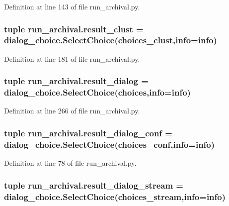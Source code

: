 Definition at line 143 of file run\-\_\-archival.\-py.

\hypertarget{namespacerun__archival_a722e4f43ec0f9bfe74c6535f3ebe2f62}{
\subsubsection[{result\-\_\-clust}]{\setlength{\rightskip}{0pt plus 5cm}tuple run\-\_\-archival.\-result\-\_\-clust = dialog\-\_\-choice.\-Select\-Choice({\bf choices\-\_\-clust},{\bf info}={\bf info})}}\label{namespacerun__archival_a722e4f43ec0f9bfe74c6535f3ebe2f62}


Definition at line 181 of file run\-\_\-archival.\-py.

\hypertarget{namespacerun__archival_aab722c99065f3217e62daaeec3f84e6b}{
\subsubsection[{result\-\_\-dialog}]{\setlength{\rightskip}{0pt plus 5cm}tuple run\-\_\-archival.\-result\-\_\-dialog = dialog\-\_\-choice.\-Select\-Choice({\bf choices},{\bf info}={\bf info})}}\label{namespacerun__archival_aab722c99065f3217e62daaeec3f84e6b}


Definition at line 266 of file run\-\_\-archival.\-py.

\hypertarget{namespacerun__archival_a95ebfc7a9f4c5fdcac7e606bd1c8b6af}{
\subsubsection[{result\-\_\-dialog\-\_\-conf}]{\setlength{\rightskip}{0pt plus 5cm}tuple run\-\_\-archival.\-result\-\_\-dialog\-\_\-conf = dialog\-\_\-choice.\-Select\-Choice({\bf choices\-\_\-conf},{\bf info}={\bf info})}}\label{namespacerun__archival_a95ebfc7a9f4c5fdcac7e606bd1c8b6af}


Definition at line 78 of file run\-\_\-archival.\-py.

\hypertarget{namespacerun__archival_a1783f56496cd7db6da799a46bff93794}{
\subsubsection[{result\-\_\-dialog\-\_\-stream}]{\setlength{\rightskip}{0pt plus 5cm}tuple run\-\_\-archival.\-result\-\_\-dialog\-\_\-stream = dialog\-\_\-choice.\-Select\-Choice({\bf choices\-\_\-stream},{\bf info}={\bf info})}}\label{namespacerun__archival_a1783f56496cd7db6da799a46bff93794}


